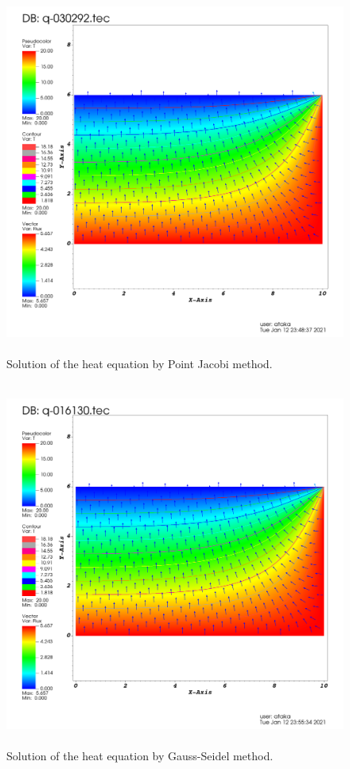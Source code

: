 \documentclass[letterpaper,12pt]{article}
\begin{document}
\begin{figure}[H] 
	\centering 
	\includegraphics[max height=12cm]{graphs/point_norad/point_norad.png}
	\caption{Solution of the heat equation by Point Jacobi method.}
 	\label{fig:pointnorad}
\end{figure}
\begin{figure}[H] 
	\centering 
	\includegraphics[max height=12cm]{graphs/gauss_norad/gauss_norad.png}
	\caption{Solution of the heat equation by Gauss-Seidel method.}
 	\label{fig:gaussnorad}
\end{figure}
\end{document}

